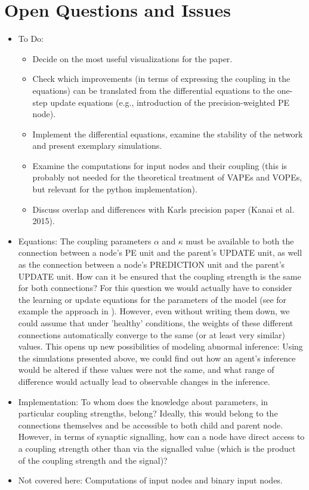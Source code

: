\section{Open Questions and Issues}

\begin{itemize}
	\item To Do: 
	\begin{itemize}
		\item Decide on the most useful visualizations for the paper.
		\item Check which improvements (in terms of expressing the coupling in the equations) can be translated from the differential equations to the one-step update equations (e.g., introduction of the precision-weighted PE node).
		\item Implement the differential equations, examine the stability of the network and present exemplary simulations. 
		\item Examine the computations for input nodes and their coupling (this is probably not needed for the theoretical treatment of \textsf{VAPE}s and \textsf{VOPE}s, but relevant for the python implementation).
		\item Discuss overlap and differences with Karls precision paper (Kanai et al. 2015).
	\end{itemize}
	
	\item Equations: The coupling parameters $\alpha$ and $\kappa$ must be available to both the connection between a node's \textsf{PE unit} and the parent's \textsf{UPDATE unit}, as well as the connection between a node's \textsf{PREDICTION unit} and the parent's \textsf{UPDATE unit}. How can it be ensured that the coupling strength is the same for both connections? For this question we would actually have to consider the learning or update equations for the parameters of the model (see for example the approach in \cite{Bogacz2017}). However, even without writing them down, we could assume that under 'healthy' conditions, the weights of these different connections automatically converge to the same (or at least very similar) values. This opens up new possibilities of modeling abnormal inference: Using the simulations presented above, we could find out how an agent's inference would be altered if these values were not the same, and what range of difference would actually lead to observable changes in the inference. 

	\item Implementation: To whom does the knowledge about parameters, in particular coupling strengths, belong? Ideally, this would belong to the connections themselves and be accessible to both child and parent node. However, in terms of synaptic signalling, how can a node have direct access to a coupling strength other than via the signalled value (which is the product of the coupling strength and the signal)?

	\item Not covered here: Computations of input nodes and binary input nodes.
\end{itemize}